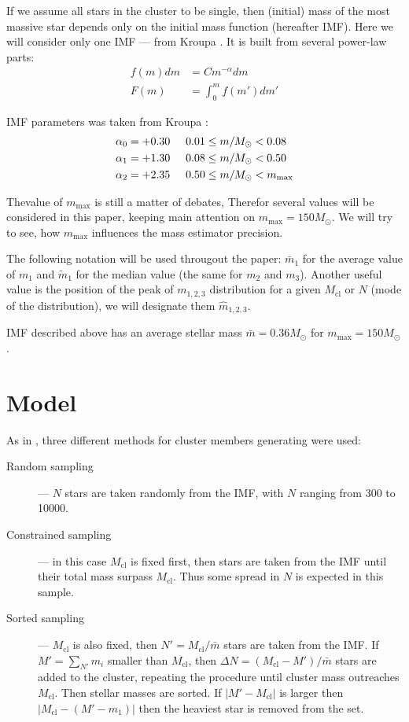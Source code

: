 \documentclass[a4paper,10pt]{article}
\newcommand{\MSun}{M_\odot}
\newcommand{\Mmax}{m_{\mathrm{max}}}
\newcommand{\Mcl}{M_{\mathrm{cl}}}
\begin{document}
If we assume all stars in the cluster to be single, then (initial) mass of the most massive star depends only on 
the initial mass function (hereafter IMF). Here we will consider only one IMF --- from Kroupa \cite{Kroupa2001}. 
It is built from several power-law parts:
\begin{align} \label{eq:spectrum}
 f(m)dm &= C m^{-\alpha} dm  \nonumber \\
 F(m) &= \int_0^{m} f(m')dm'
\end{align} 

IMF parameters was taken from Kroupa \cite{Kroupa2001}:
\begin{align} %
  \alpha_0 = +0.30 &\hspace{0.5cm} 0.01 \leq m/\MSun < 0.08 \nonumber \\
  \alpha_1 = +1.30 &\hspace{0.5cm}  0.08 \leq m/\MSun < 0.50 \\
  \alpha_2 = +2.35 &\hspace{0.5cm}  0.50 \leq m/\MSun < \Mmax \nonumber 
\end{align} 

Thevalue of $\Mmax$ is still a matter of debates, Therefor several values will be considered in this paper, keeping main attention on $\Mmax = 150 \MSun$.
We will try to see, how $\Mmax$ influences the mass estimator precision.

The following notation will be used througout the paper: $\bar{m}_1$ for the average value of $m_1$ and $\tilde{m}_1$ for the median value (the same for $m_2$ and $m_3$). Another useful value is  the position of the peak of $m_{1,2,3}$ distribution for a given $\Mcl$ or $N$ (mode of the distribution), we will designate them $\hat{m}_{1,2,3}$.

IMF described above has an average stellar mass $\bar{m} = 0.36 \MSun$ for $\Mmax = 150 \MSun$.

\section{Model}

As in \cite{Origin}, three different methods for cluster members generating were used:
\begin{description}
 \item[Random sampling] --- $N$ stars are taken randomly from the IMF, with $N$ ranging from 300 to 10000.
 \item[Constrained sampling] --- in this case $\Mcl$ is fixed first, then stars are taken from the IMF until their total mass surpass $\Mcl$. Thus some spread in $N$ is expected in this sample.
 \item[Sorted sampling] --- $\Mcl$ is also fixed, then $N' = \Mcl/\bar{m}$ stars are taken from the IMF. If $M' = \sum_{N'} m_i$ smaller than $\Mcl$, then $\Delta N = (\Mcl - M')/\bar{m}$ stars are added to the cluster, repeating the procedure until cluster mass outreaches $\Mcl$. Then stellar masses are sorted. If $|M' - \Mcl|$ is larger then $\left|\Mcl - (M'-m_{1})\right|$ then the heaviest star is removed from the set. 
\end{description}
\end{document}
